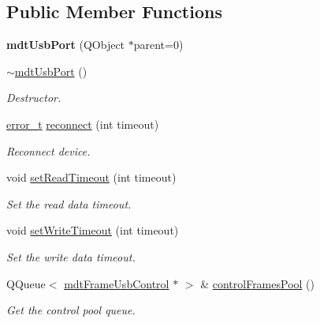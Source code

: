 \subsection*{Public Member Functions}
\begin{DoxyCompactItemize}
\item 
\hypertarget{classmdt_usb_port_a311650f4b2d29b6f16336c8777196d1c}{
{\bfseries mdtUsbPort} (QObject $\ast$parent=0)}
\label{classmdt_usb_port_a311650f4b2d29b6f16336c8777196d1c}

\item 
\hypertarget{classmdt_usb_port_afa9f1942ca4ae384887441e01b362c16}{
\hyperlink{classmdt_usb_port_afa9f1942ca4ae384887441e01b362c16}{$\sim$mdtUsbPort} ()}
\label{classmdt_usb_port_afa9f1942ca4ae384887441e01b362c16}

\begin{DoxyCompactList}\small\item\em Destructor. \end{DoxyCompactList}\item 
\hyperlink{classmdt_abstract_port_ad4121bb930c95887e77f8bafa065a85e}{error\_\-t} \hyperlink{classmdt_usb_port_af2399348faf1abc20130eab20cfc36ee}{reconnect} (int timeout)
\begin{DoxyCompactList}\small\item\em Reconnect device. \end{DoxyCompactList}\item 
void \hyperlink{classmdt_usb_port_a44ed5024a81a573b5196b8f64c42cd6a}{setReadTimeout} (int timeout)
\begin{DoxyCompactList}\small\item\em Set the read data timeout. \end{DoxyCompactList}\item 
void \hyperlink{classmdt_usb_port_a592af88bd7e7f45dd80df0ecab375ace}{setWriteTimeout} (int timeout)
\begin{DoxyCompactList}\small\item\em Set the write data timeout. \end{DoxyCompactList}\item 
QQueue$<$ \hyperlink{classmdt_frame_usb_control}{mdtFrameUsbControl} $\ast$ $>$ \& \hyperlink{classmdt_usb_port_af146b08006ddbe18fb537ae1a75b622e}{controlFramesPool} ()
\begin{DoxyCompactList}\small\item\em Get the control pool queue. \end{DoxyCompactList}\item 

\end{DoxyCompactItemize}
